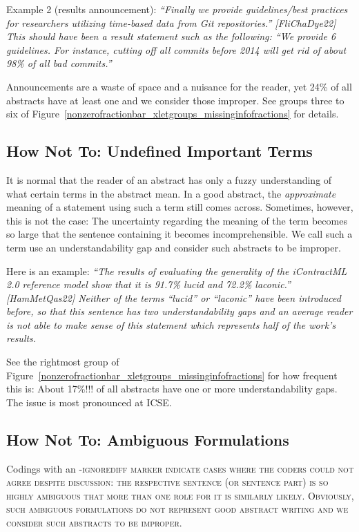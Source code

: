 \documentclass[10pt,journal,compsoc]{IEEEtran}
\newcommand{\Cb}[1]{\bgroup\scshape #1\egroup}  %
\newcommand{\Art}[1]{\bgroup[#1]\egroup} %
\newcommand{\Quote}[1]{\bgroup\itshape ``#1''\egroup}  %
\newcommand{\Pseudoquote}[1]{\bgroup\itshape ``#1''\egroup}  %
\begin{document}
Example 2 (results announcement):
\Quote{Finally we provide guidelines/best practices for researchers utilizing time-based data
from Git repositories.} \Art{FliChaDye22}  %
This should have been a result statement such as the following:
\Pseudoquote{We provide 6 guidelines. For instance, cutting off all commits before 2014
  will get rid of about 98\% of all bad commits.}

Announcements are a waste of space and a nuisance for the reader,
yet 24\% of all abstracts have at least one and we consider those improper.
See groups three to six of Figure~\ref{nonzerofractionbar_xletgroups_missinginfofractions}
for details.


\subsection{How Not To: Undefined Important Terms}\label{ugaps}

It is normal that the reader of an abstract has only a fuzzy understanding
of what certain terms in the abstract mean.
In a good abstract, the \emph{approximate} meaning of a statement using such a term
still comes across.
Sometimes, however, this is not the case:
The uncertainty regarding the meaning of the term becomes so large
that the sentence containing it becomes incomprehensible.
We call such a term use an understandability gap and consider such abstracts to be improper.

Here is an example:
\Quote{The results of evaluating the generality of the iContractML 2.0 reference model show
  that it is 91.7\% lucid and 72.2\% laconic.} \Art{HamMetQas22}
Neither of the terms ``lucid'' or ``laconic'' have been introduced before, so that
this sentence has two understandability gaps and
an average reader is not able to make sense of this statement
which represents half of the work's results.

See the rightmost group of Figure~\ref{nonzerofractionbar_xletgroups_missinginfofractions}
for how frequent this is:
About 17\%!!! of all abstracts have one or more understandability gaps.
The issue is most pronounced at ICSE.


\subsection{How Not To: Ambiguous Formulations}\label{ambiguity}

Codings with an \Cb{-ignorediff} marker indicate cases where the coders could not agree
despite discussion: the respective sentence (or sentence part) is so highly ambiguous that
more than one role for it is similarly likely.
Obviously, such ambiguous formulations do not represent good abstract writing
and we consider such abstracts to be improper.
\end{document}
